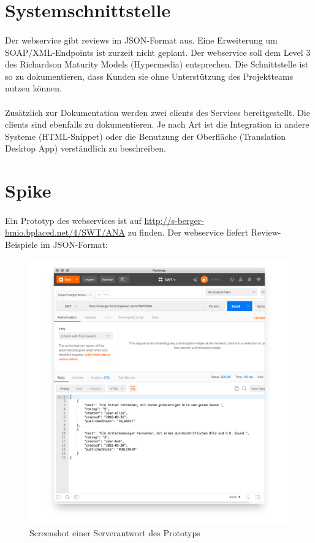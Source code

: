 \documentclass{article}
\begin{document}
\section{Systemschnittstelle}
\paragraph{}
Der \gls{webservice} gibt \gls{review}s im JSON-Format aus. Eine Erweiterung um SOAP/XML-Endpoints ist zurzeit nicht geplant. Der \gls{webservice} soll dem Level 3 des Richardson Maturity Models (Hypermedia) entsprechen. Die Schnittstelle ist so zu dokumentieren, dass Kunden sie ohne Unterstützung des Projektteams nutzen können.

\paragraph{}
Zusätzlich zur Dokumentation werden zwei \gls{client}s des Services bereitgestellt. Die \gls{client}s sind ebenfalls zu dokumentieren. Je nach Art ist die Integration in andere Systeme (HTML-Snippet) oder die Benutzung der Oberfläche (Translation Desktop App) verständlich zu beschreiben.

\pagebreak

\section{Spike}
\paragraph{}
Ein Prototyp des \gls{webservice}s ist auf \href{http://s-berger-bmio.bplaced.net/4/SWT/ANA}{\ul{http://s-berger-bmio.bplaced.net/4/SWT/ANA}}  zu finden. Der \gls{webservice} liefert Review-Beispiele im JSON-Format:
\begin{figure}[h]
  \centering
  \includegraphics[scale=.2]{spike.png}
  \caption{Screenshot einer Serverantwort des Prototyps}
  \label{spike}
\end{figure}

\pagebreak

\printglossary[title=Glossar]
\end{document}
